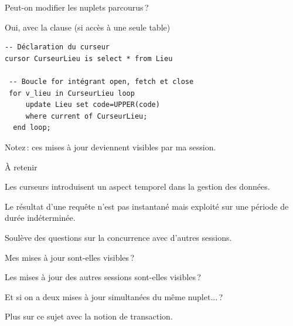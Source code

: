 \begin{frame}[fragile]{Peut-on modifier les nuplets parcourus\,?}

Oui, avec la clause  (si accès à une seule table)

\begin{small}
\begin{verbatim}
-- Déclaration du curseur
cursor CurseurLieu is select * from Lieu 

 -- Boucle for intégrant open, fetch et close
 for v_lieu in CurseurLieu loop
     update Lieu set code=UPPER(code) 
     where current of CurseurLieu;
  end loop;
\end{verbatim}
\end{small}

\vfill

Notez\,: ces mises à jour deviennent visibles par ma session.
\end{frame}


\begin{frame}{À retenir}

Les curseurs introduisent un aspect \alert{temporel} dans la gestion des données.

\vfill


Le résultat d'une requête n'est pas instantané mais exploité sur une
période de durée indéterminée.

\vfill

Soulève des questions sur la \alert{concurrence} avec d'autres sessions.

\begin{redbullet}
   \item Mes mises à jour sont-elles visibles\,?
   \item Les mises à jour des autres sessions sont-elles visibles\,?
  \item Et si on a deux mises à jour  \alert{simultanées} du même nuplet...\,?
\end{redbullet}

\vfill

Plus sur ce sujet avec la notion de \alert{transaction}.
\end{frame}
